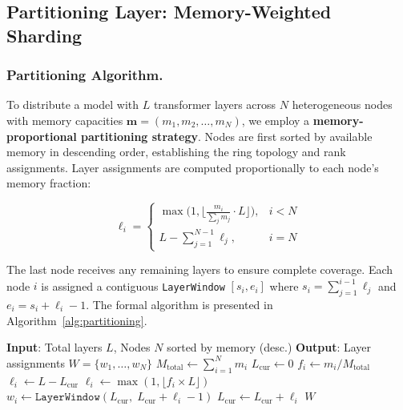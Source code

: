 \documentclass[runningheads]{llncs}
\begin{document}
\subsection{Partitioning Layer: Memory-Weighted Sharding}
\label{sec:partitioning}

\subsubsection{Partitioning Algorithm.}
To distribute a model with $L$ transformer layers across $N$ heterogeneous nodes with memory capacities $\mathbf{m} = (m_1, m_2, \ldots, m_N)$, we employ a \textbf{memory-proportional partitioning strategy}. Nodes are first sorted by available memory in descending order, establishing the ring topology and rank assignments. Layer assignments are computed proportionally to each node's memory fraction:

\begin{equation}
\ell_i = \begin{cases}
\max\!\big(1, \lfloor \frac{m_i}{\sum_j m_j} \cdot L \rfloor\big), & i < N \\[4pt]
L - \sum_{j=1}^{N-1} \ell_j, & i = N
\end{cases}
\label{eq:layer_alloc}
\end{equation}

\noindent The last node receives any remaining layers to ensure complete coverage. Each node $i$ is assigned a contiguous \texttt{LayerWindow} $[s_i, e_i]$ where $s_i = \sum_{j=1}^{i-1} \ell_j$ and $e_i = s_i + \ell_i - 1$. The formal algorithm is presented in Algorithm~\ref{alg:partitioning}.

\begin{algorithm}[t]
\caption{Memory-Weighted Layer Partitioning}
\label{alg:partitioning}
\begin{algorithmic}[1]
\STATE \textbf{Input}: Total layers $L$, Nodes $N$ sorted by memory (desc.)
\STATE \textbf{Output}: Layer assignments $W = \{w_1, \ldots, w_N\}$
\STATE $M_{\text{total}} \gets \sum_{i=1}^{N} m_i$
\STATE $L_{\text{cur}} \gets 0$
    \STATE $f_i \gets m_i / M_{\text{total}}$ 
        \STATE $\ell_i \gets L - L_{\text{cur}}$ 
    \ELSE
        \STATE $\ell_i \gets \max(1, \lfloor f_i \times L \rfloor)$
    \ENDIF
    \STATE $w_i \gets \texttt{LayerWindow}(L_{\text{cur}},\; L_{\text{cur}} + \ell_i - 1)$
    \STATE $L_{\text{cur}} \gets L_{\text{cur}} + \ell_i$
\ENDFOR
\RETURN $W$
\end{algorithmic}
\end{algorithm}
\end{document}
